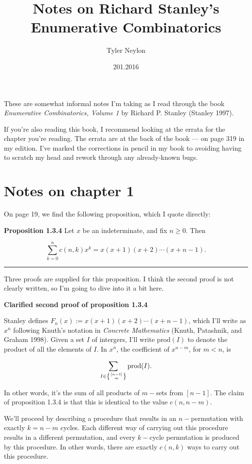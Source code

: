 \documentclass[]{article}
\title{Notes on Richard Stanley's Enumerative Combinatorics}
\author{Tyler Neylon}
\date{201.2016}
\begin{document}
\maketitle

These are somewhat informal notes I'm taking as I read through the book
\emph{Enumerative Combinatorics, Volume 1} by Richard P. Stanley
(Stanley 1997).

If you're also reading this book, I recommend looking at the errata for
the chapter you're reading. The errata are at the back of the book ---
on page 319 in my edition. I've marked the corrections in pencil in my
book to avoiding having to scratch my head and rework through any
already-known bugs.

\section{Notes on chapter 1}\label{notes-on-chapter-1}

On page 19, we find the following proposition, which I quote directly:

\textbf{Proposition 1.3.4} Let \(x\) be an indeterminate, and fix
\(n\ge 0\). Then

\[\sum_{k=0}^n c(n,k) x^k = x(x + 1)(x + 2)\cdots (x + n - 1).\]

\begin{center}\rule{0.5\linewidth}{\linethickness}\end{center}

Three proofs are supplied for this proposition. I think the second proof
is not clearly written, so I'm going to dive into it a bit here.

\textbf{Clarified second proof of proposition 1.3.4}

Stanley defines \(F_n(x) := x(x + 1)(x + 2)\cdots (x + n - 1)\), which
I'll write as \(x^{\overline{n}}\) following Knuth's notation in
\emph{Concrete Mathematics} (Knuth, Patashnik, and Graham 1998). Given a
set \(I\) of intergers, I'll write \(\text{prod}(I)\) to denote the
product of all the elements of \(I\). In \(x^{\overline{n}}\), the
coefficient of \(x^{n-m}\), for \(m<n\), is

\[ \sum_{I \in \left\{{[n-1]\atop m}\right\}} \text{prod}(I). \]

In other words, it's the sum of all products of \(m-\)sets from
\([n-1]\). The claim of proposition 1.3.4 is that this is identical to
the value \(c(n,n-m)\).

We'll proceed by describing a procedure that results in an
\(n-\)permutation with exactly \(k=n-m\) cycles. Each different way of
carrying out this procedure results in a different permutation, and
every \(k-\)cycle permutation is produced by this procedure. In other
words, there are exactly \(c(n, k)\) ways to carry out this procedure.
\end{document}
